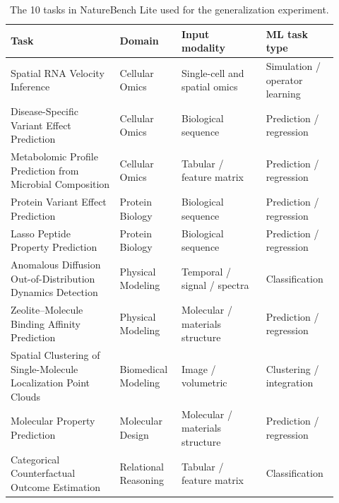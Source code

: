 \begin{table}[htbp]
\centering
\caption{The 10 tasks in NatureBench Lite used for the generalization experiment.}
\label{tab:naturebench-lite-tasks}
\vspace{0.4em}
\scriptsize
\setlength{\tabcolsep}{3pt}
\renewcommand{\arraystretch}{1.1}
\begin{tabular}{@{}>{\raggedright\arraybackslash}p{0.31\linewidth}>{\raggedright\arraybackslash}p{0.17\linewidth}>{\raggedright\arraybackslash}p{0.24\linewidth}>{\raggedright\arraybackslash}p{0.20\linewidth}@{}}
\toprule
Task & Domain & Input modality & ML task type \\
\midrule
Spatial RNA Velocity Inference & Cellular Omics & Single-cell and spatial omics & Simulation / operator learning \\
Disease-Specific Variant Effect Prediction & Cellular Omics & Biological sequence & Prediction / regression \\
Metabolomic Profile Prediction from Microbial Composition & Cellular Omics & Tabular / feature matrix & Prediction / regression \\
Protein Variant Effect Prediction & Protein Biology & Biological sequence & Prediction / regression \\
Lasso Peptide Property Prediction & Protein Biology & Biological sequence & Prediction / regression \\
Anomalous Diffusion Out-of-Distribution Dynamics Detection & Physical Modeling & Temporal / signal / spectra & Classification \\
Zeolite--Molecule Binding Affinity Prediction & Physical Modeling & Molecular / materials structure & Prediction / regression \\
Spatial Clustering of Single-Molecule Localization Point Clouds & Biomedical Modeling & Image / volumetric & Clustering / integration \\
Molecular Property Prediction & Molecular Design & Molecular / materials structure & Prediction / regression \\
Categorical Counterfactual Outcome Estimation & Relational Reasoning & Tabular / feature matrix & Classification \\
\bottomrule
\end{tabular}
\end{table}


